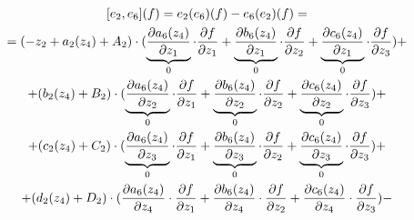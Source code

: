 \documentclass{article}
\begin{document}
\begin{equation*}
\begin{gathered}
$[$e_{2}, e_{6}$]$(f) = e_{2}(e_{6})(f) - e_{6}(e_{2})(f) =
 \\ = (-z_{2} + a_{2}(z_{4}) + A_{2}) \cdot ( \underbrace{\frac{\partial a_{6}(z_{4})}{\partial z_{1}}}_{0} \cdot \frac{\partial f}{\partial z_{1}}
  + \underbrace{\frac{\partial b_{6}(z_{4})}{\partial z_{1}}}_{0} \cdot \frac{\partial f}{\partial z_{2}}
   + \underbrace{\frac{\partial c_{6}(z_{4})}{\partial z_{1}}}_{0} \cdot \frac{\partial f}{\partial z_{3}}) +

  \\ + (b_{2}(z_{4}) + B_{2}) \cdot (\underbrace{\frac{\partial a_{6}(z_{4})}{\partial z_{2}}}_{0} \cdot \frac{\partial f}{\partial z_{1}}
   + \underbrace{\frac{\partial b_{6}(z_{4})}{\partial z_{2}}}_{0} \cdot \frac{\partial f}{\partial z_{2}}
    + \underbrace{\frac{\partial c_{6}(z_{4})}{\partial z_{2}}}_{0} \cdot \frac{\partial f}{\partial z_{3}}) +

  \\ + (c_{2}(z_{4}) + C_{2}) \cdot (\underbrace{\frac{\partial a_{6}(z_{4})}{\partial z_{3}}}_{0} \cdot \frac{\partial f}{\partial z_{1}}
   + \underbrace{\frac{\partial b_{6}(z_{4})}{\partial z_{3}}}_{0} \cdot \frac{\partial f}{\partial z_{2}}
    + \underbrace{\frac{\partial c_{6}(z_{4})}{\partial z_{3}}}_{0} \cdot \frac{\partial f}{\partial z_{3}}) +

  \\ + (d_{2}(z_{4}) + D_{2}) \cdot (\frac{\partial a_{6}(z_{4})}{\partial z_{4}} \cdot \frac{\partial f}{\partial z_{1}}
   + \frac{\partial b_{6}(z_{4})}{\partial z_{4}} \cdot \frac{\partial f}{\partial z_{2}}
    + \frac{\partial c_{6}(z_{4})}{\partial z_{4}} \cdot \frac{\partial f}{\partial z_{3}}) -


\end{gathered}
\end{equation*}
\end{document}
